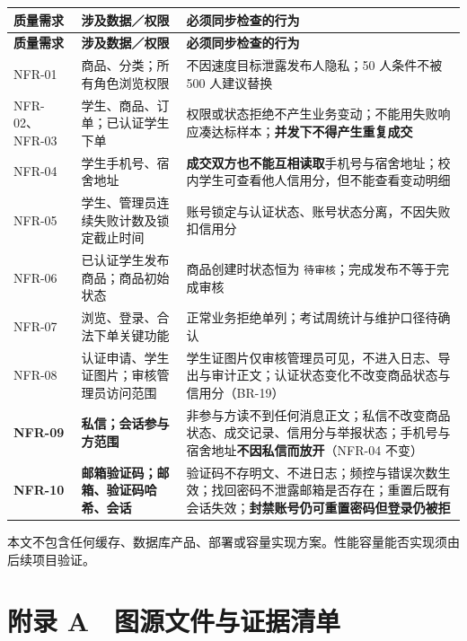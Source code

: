 \documentclass[12pt,a4paper]{ctexart}
\begin{document}
{\scriptsize
\begin{longtable}{|p{2.00cm}|p{4.26cm}|p{9.74cm}|}
\hline
\textbf{质量需求} & \textbf{涉及数据／权限} & \textbf{必须同步检查的行为} \\
\hline
\endfirsthead
\hline
\textbf{质量需求} & \textbf{涉及数据／权限} & \textbf{必须同步检查的行为} \\
\hline
\endhead
\hline
\endfoot
NFR-01 & 商品、分类；所有角色浏览权限 & 不因速度目标泄露发布人隐私；50 人条件不被 500 人建议替换 \\
\hline
NFR-02、NFR-03 & 学生、商品、订单；已认证学生下单 & 权限或状态拒绝不产生业务变动；不能用失败响应凑达标样本；\textbf{并发下不得产生重复成交} \\
\hline
NFR-04 & 学生手机号、宿舍地址 & \textbf{成交双方也不能互相读取}手机号与宿舍地址；校内学生可查看他人信用分，但不能查看变动明细 \\
\hline
NFR-05 & 学生、管理员连续失败计数及锁定截止时间 & 账号锁定与认证状态、账号状态分离，不因失败扣信用分 \\
\hline
NFR-06 & 已认证学生发布商品；商品初始状态 & 商品创建时状态恒为 \texttt{待审核}；完成发布不等于完成审核 \\
\hline
NFR-07 & 浏览、登录、合法下单关键功能 & 正常业务拒绝单列；考试周统计与维护口径待确认 \\
\hline
NFR-08 & 认证申请、学生证图片；审核管理员访问范围 & 学生证图片仅审核管理员可见，不进入日志、导出与审计正文；认证状态变化不改变商品状态与信用分（BR-19） \\
\hline
\textbf{NFR-09} & \textbf{私信；会话参与方范围} & 非参与方读不到任何消息正文；私信不改变商品状态、成交记录、信用分与举报状态；手机号与宿舍地址\textbf{不因私信而放开}（NFR-04 不变） \\
\hline
\textbf{NFR-10} & \textbf{邮箱验证码；邮箱、验证码哈希、会话} & 验证码不存明文、不进日志；频控与错误次数生效；找回密码不泄露邮箱是否存在；重置后既有会话失效；\textbf{封禁账号仍可重置密码但登录仍被拒} \\
\hline
\end{longtable}
}


本文不包含任何缓存、数据库产品、部署或容量实现方案。性能容量能否实现须由后续项目验证。



\section*{附录 A　图源文件与证据清单}
\end{document}
